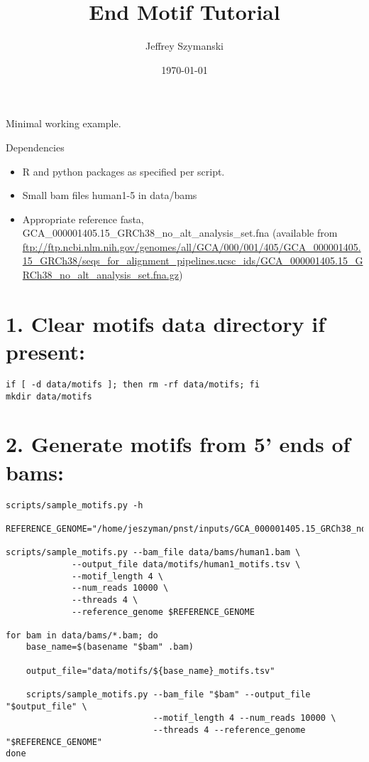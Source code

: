\documentclass{article}
\author{Jeffrey Szymanski}
\date{\today}
\title{End Motif Tutorial}
\begin{document}
\maketitle
Minimal working example.

Dependencies
\begin{itemize}
\item R and python packages as specified per script.
\item Small bam files human1-5 in data/bams
\item Appropriate reference fasta, GCA\_000001405.15\_GRCh38\_no\_alt\_analysis\_set.fna (available from \url{ftp://ftp.ncbi.nlm.nih.gov/genomes/all/GCA/000/001/405/GCA\_000001405.15\_GRCh38/seqs\_for\_alignment\_pipelines.ucsc\_ids/GCA\_000001405.15\_GRCh38\_no\_alt\_analysis\_set.fna.gz})
\end{itemize}


\section*{1. Clear motifs data directory if present:}
\label{sec:org010d905}

\begin{verbatim}
if [ -d data/motifs ]; then rm -rf data/motifs; fi
mkdir data/motifs
\end{verbatim}

\section*{2. Generate motifs from 5' ends of bams:}
\label{sec:org2ae4076}

\begin{verbatim}
scripts/sample_motifs.py -h

REFERENCE_GENOME="/home/jeszyman/pnst/inputs/GCA_000001405.15_GRCh38_no_alt_analysis_set.fna"

scripts/sample_motifs.py --bam_file data/bams/human1.bam \
			 --output_file data/motifs/human1_motifs.tsv \
			 --motif_length 4 \
			 --num_reads 10000 \
			 --threads 4 \
			 --reference_genome $REFERENCE_GENOME

for bam in data/bams/*.bam; do
    base_name=$(basename "$bam" .bam)

    output_file="data/motifs/${base_name}_motifs.tsv"

    scripts/sample_motifs.py --bam_file "$bam" --output_file "$output_file" \
                             --motif_length 4 --num_reads 10000 \
                             --threads 4 --reference_genome "$REFERENCE_GENOME"
done
\end{verbatim}
\end{document}
